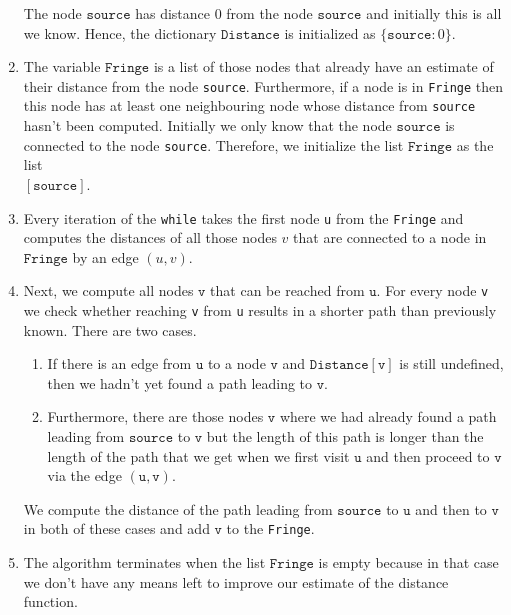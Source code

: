 \begin{enumerate}
      The node $\texttt{source}$ has distance $0$ from the node $\texttt{source}$ and initially this is
      all we know.  Hence, the dictionary $\texttt{Distance}$ is initialized as $\bigl\{\texttt{source}:0 \bigr\}$.
\item The variable $\texttt{Fringe}$ is a list of those nodes that already have an estimate of
      their distance from the  node \texttt{source}.  Furthermore, if a node is in \texttt{Fringe} then this
      node has at least one neighbouring node whose distance from \texttt{source} hasn't been computed. 
      Initially we only know that the node $\texttt{source}$ is connected to the node \texttt{source}.
      Therefore, we initialize the list $\texttt{Fringe}$ as the list
      \\[0.2cm]
      \hspace*{1.3cm}
      $[ \texttt{source} ]$.
\item Every iteration of the \texttt{while} takes the first node \texttt{u} from the \texttt{Fringe} and computes the
      distances of all those nodes $v$ that are 
      connected to a node in $\texttt{Fringe}$ by an edge $(u,v)$.
\item Next, we compute all nodes $\texttt{v}$ that can be reached from $\texttt{u}$. For every node \texttt{v} we check whether 
      reaching \texttt{v} from \texttt{u} results in a shorter path than previously known.
      There are two cases.
      \begin{enumerate}
      \item If there is an edge from $\texttt{u}$ to a node $\texttt{v}$ and  $\texttt{Distance}[\texttt{v}]$ is still
            undefined, then we hadn't yet found a path leading to $\texttt{v}$.
      \item Furthermore, there are those nodes $\texttt{v}$ where we had already found a path leading from
            $\texttt{source}$ to $\texttt{v}$ but the length of this path is longer than the length of the path
            that we get when we first visit $\texttt{u}$ and then proceed to $\texttt{v}$ via the edge $(\texttt{u},\texttt{v})$.
      \end{enumerate}
      We compute the distance of the path leading from $\texttt{source}$ to $\texttt{u}$ and then to
      $\texttt{v}$ in both of these cases and add $\texttt{v}$ to the \texttt{Fringe}.
\item The algorithm terminates when the list $\texttt{Fringe}$ is empty because in that case we don't
      have any means left to improve our estimate of the distance function.
\end{enumerate}

